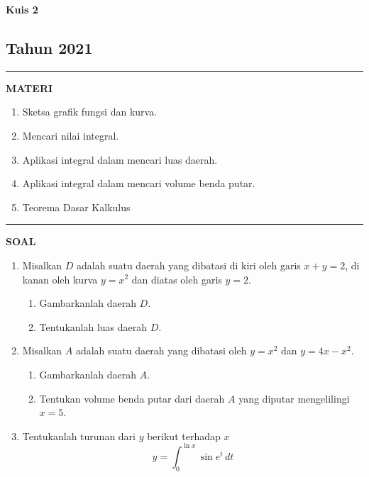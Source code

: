 \begin{flushright}
    \textbf{\Large{Kuis 2}}
    \subsection*{Tahun 2021}
\end{flushright}


\vspace{0.5cm}\hrule height 2pt\vspace{0.5cm}


\begin{center}
\textbf{\large{MATERI}}
\begin{enumerate}[leftmargin=*, label={\arabic*}.]
\item Sketsa grafik fungsi dan kurva.
\item Mencari nilai integral.
\item Aplikasi integral dalam mencari luas daerah.
\item Aplikasi integral dalam mencari volume benda putar.
\item Teorema Dasar Kalkulus
\end{enumerate}
\end{center}


\vspace{0.2cm}\hrule height 1pt\vspace{0.5cm}


\begin{center}
\textbf{\large{SOAL}}
\end{center}
\begin{enumerate}[leftmargin=*, label={\arabic*}.]
\item Misalkan $D$ adalah suatu daerah yang dibatasi di kiri oleh garis $x+y=2$, 
di kanan oleh kurva $y=x^{2}$ dan diatas oleh garis $y=2$.
    \begin{enumerate}[label={\alph*}.]
    \item Gambarkanlah daerah $D$.
    \item Tentukanlah luas daerah $D$.
    \end{enumerate}
\item Misalkan $A$ adalah suatu daerah yang dibatasi oleh $y=x^{2}$ dan $y=4x-x^{2}$.
    \begin{enumerate}[label={\alph*}.]
    \item Gambarkanlah daerah $A$.
    \item Tentukan volume benda putar dari daerah $A$ yang diputar mengelilingi $x=5$.
    \end{enumerate}
\item Tentukanlah turunan dari $y$ berikut terhadap $x$
\[
y = \int_{0}^{\ln x}\sin e^{t}\,dt
\]
\end{enumerate}


